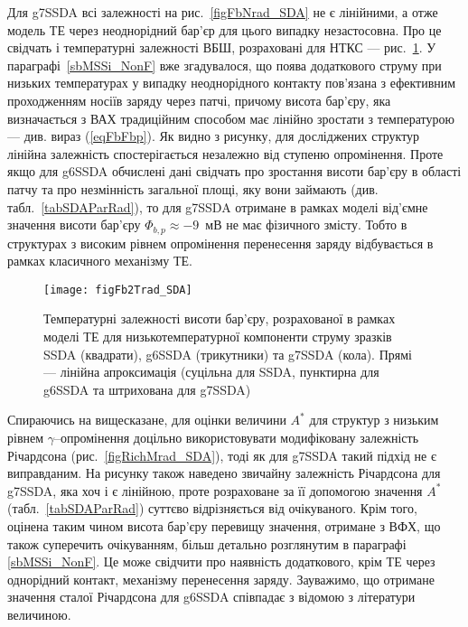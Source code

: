 Для g7SSDA всі залежності на рис.~\ref{figFbNrad_SDA} не є лінійними, а отже модель ТЕ через неоднорідний бар'єр для цього випадку незастосовна.
Про це свідчать і температурні залежності ВБШ, розраховані для НТКС --- рис.~\ref{figFb2Trad_SDA}.
У параграфі~\ref{sbMSSi_NonF} вже згадувалося, що поява додаткового струму при низьких температурах у випадку неоднорідного контакту
пов'язана з ефективним проходженням носіїв заряду через патчі, причому висота бар'єру, яка визначається з ВАХ традиційним способом має лінійно зростати з температурою
--- див. вираз (\ref{eqFbFbp}).
Як видно з рисунку, для досліджених структур лінійна залежність спостерігається незалежно від ступеню опромінення.
Проте якщо для g6SSDA обчислені дані свідчать про зростання висоти бар'єру в області патчу та про незмінність загальної площі, яку вони займають (див. табл.~\ref{tabSDAParRad}),
то для g7SSDA отримане в рамках моделі від'ємне значення висоти бар'єру $\Phi_{b,p}\approx-9$~мВ не має фізичного змісту.
Тобто в структурах з високим рівнем опромінення перенесення заряду відбувається в рамках класичного механізму ТЕ.



\begin{figure}
\center
\texttt{[image: figFb2Trad\_SDA]}
\caption{\label{figFb2Trad_SDA}
Температурні залежності висоти бар'єру, розрахованої в рамках моделі ТЕ
для низькотемпературної компоненти струму зразків SSDA (квадрати),
g6SSDA (трикутники) та g7SSDA (кола).
Прямі  --- лінійна апроксимація (суцільна для SSDA, пунктирна для g6SSDA та
штрихована для g7SSDA)
}%
\end{figure}

Спираючись на вищесказане, для оцінки величини $A^*$ для структур з низьким рівнем $\gamma$--опромінення доцільно використовувати
модифіковану залежність Річардсона (рис.~\ref{figRichMrad_SDA}), тоді як для g7SSDA такий підхід не є виправданим.
На рисунку також наведено звичайну залежність Річардсона для g7SSDA, яка хоч і є лінійною,
проте розраховане за її допомогою значення $A^*$ (табл.~\ref{tabSDAParRad}) суттєво відрізняється від очікуваного.
Крім того, оцінена таким чином висота бар'єру перевищу значення, отримане з ВФХ, що також суперечить очікуванням,
більш детально розглянутим в параграфі \ref{sbMSSi_NonF}.
Це може свідчити про наявність додаткового, крім ТЕ через однорідний контакт,
механізму перенесення заряду.
Зауважимо, що отримане значення сталої Річардсона для g6SSDA співпадає з відомою з літератури величиною.


